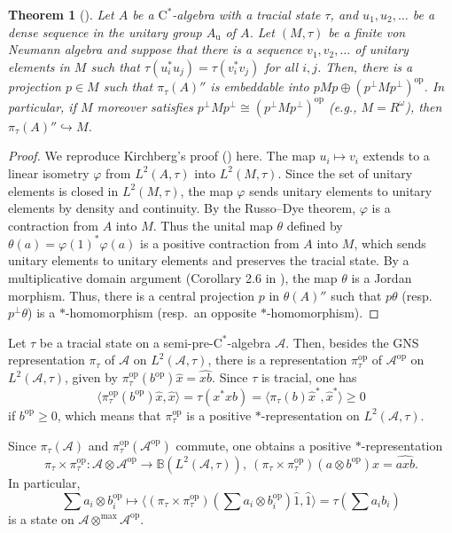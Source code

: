 \documentclass[12pt]{amsart}
\newtheorem{thm}{Theorem}
\theoremstyle{definition}
\begin{document}
\begin{thm}[\cite{kirchberg}]\label{thm:kuq}
Let $A$ be a {$\mathrm{C}^*$-alge\-bra\xspace} with a tracial state $\tau$, and $u_1,u_2,\ldots$ be
a dense sequence in the unitary group $A_{\mathrm{u}}$ of $A$.
Let $(M,\tau)$ be a finite von Neumann algebra and suppose that
there is a sequence $v_1,v_2,\ldots$ of unitary elements in $M$
such that $\tau(u_i^*u_j)=\tau(v_i^*v_j)$ for all $i,j$.
Then, there is a projection $p\in M$ such that $\pi_\tau(A)''$
is embeddable into $pMp\oplus(p^\perp M p^\perp)^{\mathrm{op}}$.
In particular, if $M$ moreover satisfies $p^\perp Mp^\perp\cong(p^\perp M p^\perp)^{\mathrm{op}}$
(e.g., $M=R^\omega$), then $\pi_\tau(A)''\hookrightarrow M$.
\end{thm}
\begin{proof}
We reproduce Kirchberg's proof (\cite{kirchberg}) here.
The map $u_i\mapsto v_i$ extends to a linear isometry ${\varphi}$
from $L^2(A,\tau)$ into $L^2(M,\tau)$.
Since the set of unitary elements is closed in $L^2(M,\tau)$,
the map ${\varphi}$ sends unitary elements to unitary elements by density and continuity.
By the Russo--Dye theorem, ${\varphi}$ is a contraction from $A$ into $M$. Thus the unital map
$\theta$ defined by $\theta(a)={\varphi}(1)^*{\varphi}(a)$ is a positive contraction from
$A$ into $M$, which sends unitary elements to unitary elements and preserves the tracial state.
By a multiplicative domain argument (Corollary 2.6 in \cite{qwep}),
the map $\theta$ is a Jordan morphism. Thus, there is a central
projection $p$ in $\theta(A)''$ such that $p\theta$ (resp.\ $p^\perp\theta$)
is a {$*$-homo\-mor\-phism\xspace} (resp.\ an opposite {$*$-homo\-mor\-phism\xspace}).
\end{proof}

Let $\tau$ be a tracial state on a {semi-pre-$\mathrm{C}^*$-alge\-bra\xspace} ${{\mathcal A}}$.
Then, besides the GNS representation $\pi_\tau$ of ${{\mathcal A}}$ on $L^2({{\mathcal A}},\tau)$,
there is a representation $\pi_\tau^{\mathrm{op}}$ of ${{\mathcal A}}^{\mathrm{op}}$ on $L^2({{\mathcal A}},\tau)$,
given by
$\pi_\tau^{\mathrm{op}}(b^{\mathrm{op}})\hat{x}=\widehat{xb}$. Since $\tau$ is tracial, one has
\[
{\mathopen{\langle}{\pi_\tau^{\mathrm{op}}(b^{\mathrm{op}})\hat{x},\hat{x}}\mathclose{\rangle}}=\tau(x^*xb)={\mathopen{\langle}{\pi_\tau(b)\hat{x}^*,\hat{x}^*}\mathclose{\rangle}}\geq0
\]
if $b^{\mathrm{op}}\geq0$, which means that $\pi_\tau^{\mathrm{op}}$
is a positive $*$-representation on $L^2({{\mathcal A}},\tau)$.

Since $\pi_\tau({{\mathcal A}})$ and $\pi_\tau^{\mathrm{op}}({{\mathcal A}}^{\mathrm{op}})$ commute, one obtains a positive {$*$-repre\-sen\-ta\-tion\xspace}
\[
\pi_\tau\times\pi_\tau^{\mathrm{op}}\colon{{\mathcal A}}\otimes{{\mathcal A}}^{\mathrm{op}}\to{{\mathbb B}}(L^2({{\mathcal A}},\tau)),\
(\pi_\tau\times\pi_\tau^{\mathrm{op}})(a\otimes b^{\mathrm{op}})\hat{x}=\widehat{axb}.
\]
In particular,
\[
\sum a_i\otimes b_i^{\mathrm{op}} \mapsto
{\mathopen{\langle}{(\pi_\tau\times\pi_\tau^{\mathrm{op}})(\sum a_i\otimes b_i^{\mathrm{op}})\hat{1},\hat{1}}\mathclose{\rangle}} = \tau(\sum a_i b_i )
\]
is a state on ${{\mathcal A}}\otimes^{\max}{{\mathcal A}}^{\mathrm{op}}$.
\end{document}
